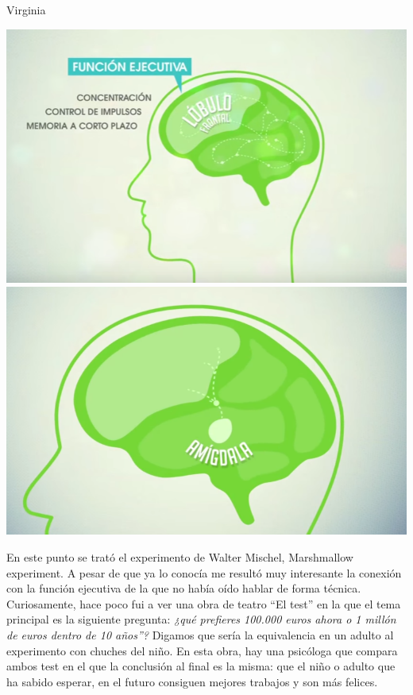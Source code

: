 \begin{opin}{\virgicolor}{Virginia}
\begin{minipage}[hbtp]{1.0\linewidth}
\centering
\includegraphics[width=0.4\linewidth]{img/viryi1.png}
\includegraphics[width=0.408\linewidth]{img/viryi2.png}
\label{viramigdala}
\end{minipage}


En este punto se trató el experimento de Walter Mischel, Marshmallow experiment. A pesar de que ya lo conocía me resultó muy interesante la conexión con la función ejecutiva de la que no había oído hablar de forma técnica. Curiosamente, hace poco fui a ver una obra de teatro “El test” en la que el tema principal es la siguiente pregunta: \textit{¿qué prefieres 100.000 euros ahora o 1 millón de euros dentro de 10 años”?} Digamos que sería la equivalencia en un adulto al experimento con chuches del niño. En esta obra, hay una psicóloga que compara ambos test en el que la conclusión al final es la misma: que el niño o adulto que ha sabido esperar, en el futuro consiguen mejores trabajos y son más felices.







\end{opin}
